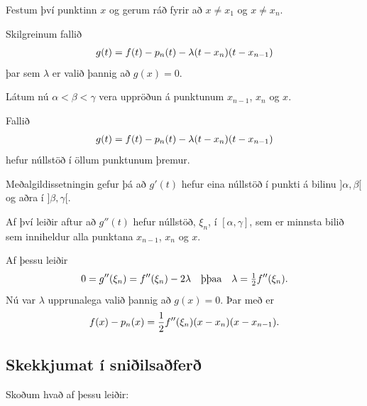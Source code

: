 \documentclass[A4paper,10pt,icelandic]{sphinxmanual}
\begin{document}
Festum því punktinn \(x\) og gerum ráð fyrir að \(x\neq x_1\) og
\(x\neq x_n\).

Skilgreinum fallið
\begin{gather}
\begin{split}g(t)=f(t)-p_n(t)-\lambda(t-x_n)(t-x_{n-1})\end{split}\notag
\end{gather}
þar sem \(\lambda\) er valið þannig að \(g(x)=0\).

Látum nú \(\alpha<\beta<\gamma\) vera uppröðun á punktunum
\(x_{n-1}\), \(x_n\) og \(x\).

Fallið
\begin{gather}
\begin{split}g(t)=f(t)-p_n(t)-\lambda(t-x_n)(t-x_{n-1})\end{split}\notag
\end{gather}
hefur núllstöð í öllum punktunum þremur.

Meðalgildissetningin gefur þá að \(g'(t)\) hefur eina núllstöð í
punkti á bilinu \(]\alpha,\beta[\) og aðra í \(]\beta,\gamma[\).

Af því leiðir aftur að \(g''(t)\) hefur núllstöð, \(\xi_n\), í
\([\alpha,\gamma]\), sem er minnsta bilið sem inniheldur alla
punktana \(x_{n-1}\), \(x_n\) og \(x\).

Af þessu leiðir
\begin{gather}
\begin{split}0=g''(\xi_n)=f''(\xi_n)-2\lambda \quad \text{þþaa} \quad
\lambda=\tfrac 12 f''(\xi_n).\end{split}\notag
\end{gather}
Nú var \(\lambda\) upprunalega valið þannig að \(g(x)=0\). Þar
með er
\begin{gather}
\begin{split}f(x) - p_n(x) = \frac{1}{2}f''(\xi_n)(x-x_n)(x-x_{n-1}).\end{split}\notag
\end{gather}

\subsection{Skekkjumat í sniðilsaðferð}
\label{kafli02:skekkjumat-i-sniilsafer}
Skoðum hvað af þessu leiðir:
\end{document}
